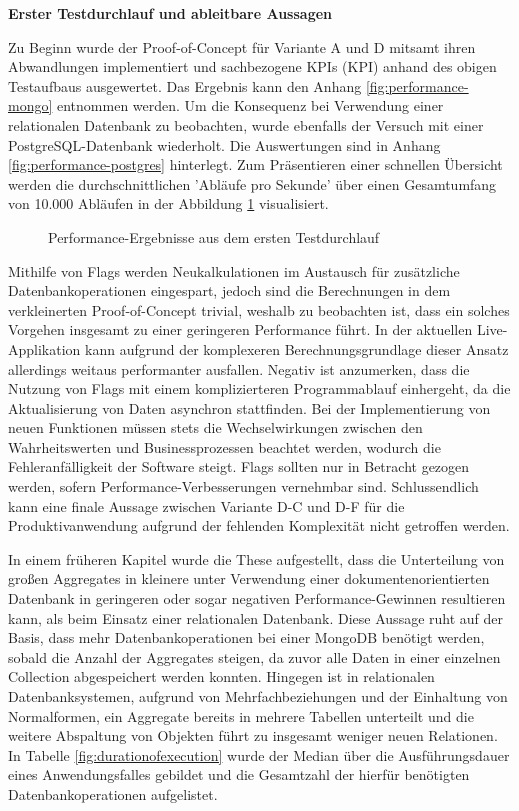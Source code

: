 \textbf{Erster Testdurchlauf und ableitbare Aussagen}

Zu Beginn wurde der Proof-of-Concept für Variante A und D mitsamt ihren Abwandlungen implementiert und sachbezogene \acrshort{KPI}s (\acrlong{KPI}) anhand des obigen Testaufbaus ausgewertet. Das Ergebnis kann den Anhang \ref{fig:performance-mongo} entnommen werden. Um die Konsequenz bei Verwendung einer relationalen Datenbank zu beobachten, wurde ebenfalls der Versuch mit einer PostgreSQL-Datenbank wiederholt. Die Auswertungen sind in Anhang \ref{fig:performance-postgres} hinterlegt. Zum Präsentieren einer schnellen Übersicht werden die durchschnittlichen 'Abläufe pro Sekunde' über einen Gesamtumfang von 10.000 Abläufen in der Abbildung \ref{fig:PerformanceDefault} visualisiert.

\begin{figure}[htpb]
	\centering
	\footnotesize
	
	\caption{Performance-Ergebnisse aus dem ersten Testdurchlauf}
	\label{fig:PerformanceDefault}
\end{figure}

Mithilfe von Flags werden Neukalkulationen im Austausch für zusätzliche Datenbankoperationen eingespart, jedoch sind die Berechnungen in dem verkleinerten Proof-of-Concept trivial, weshalb zu beobachten ist, dass ein solches Vorgehen insgesamt zu einer geringeren Performance führt. In der aktuellen Live-Applikation kann aufgrund der komplexeren Berechnungsgrundlage dieser Ansatz allerdings weitaus performanter ausfallen. Negativ ist anzumerken, dass die Nutzung von Flags mit einem komplizierteren Programmablauf einhergeht, da die Aktualisierung von Daten asynchron stattfinden. Bei der Implementierung von neuen Funktionen müssen stets die Wechselwirkungen zwischen den Wahrheitswerten und Businessprozessen beachtet werden, wodurch die Fehleranfälligkeit der Software steigt. Flags sollten nur in Betracht gezogen werden, sofern Performance-Verbesserungen vernehmbar sind. Schlussendlich kann eine finale Aussage zwischen Variante D-C und D-F für die Produktivanwendung aufgrund der fehlenden Komplexität nicht getroffen werden.

In einem früheren Kapitel wurde die These aufgestellt, dass die Unterteilung von großen Aggregates in kleinere unter Verwendung einer dokumentenorientierten Datenbank in geringeren oder sogar negativen Performance-Gewinnen resultieren kann, als beim Einsatz einer relationalen Datenbank. Diese Aussage ruht auf der Basis, dass mehr Datenbankoperationen bei einer MongoDB benötigt werden, sobald die Anzahl der Aggregates steigen, da zuvor alle Daten in einer einzelnen Collection abgespeichert werden konnten. Hingegen ist in relationalen Datenbanksystemen, aufgrund von Mehrfachbeziehungen und der Einhaltung von Normalformen, ein Aggregate bereits in mehrere Tabellen unterteilt und die weitere Abspaltung von Objekten führt zu insgesamt weniger neuen Relationen. In Tabelle \ref{fig:durationofexecution} wurde der Median über die Ausführungsdauer eines Anwendungsfalles gebildet und die Gesamtzahl der hierfür benötigten Datenbankoperationen aufgelistet. 

